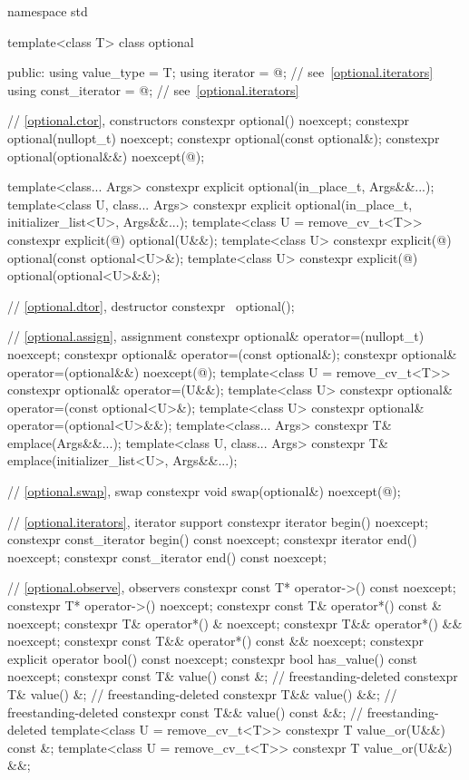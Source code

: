 %
%
\begin{codeblock}
namespace std {
  template<class T>
  class optional {
  public:
    using value_type     = T;
    using iterator       = @\impdefnc@;              // see~\ref{optional.iterators}
    using const_iterator = @\impdefnc@;              // see~\ref{optional.iterators}

    // \ref{optional.ctor}, constructors
    constexpr optional() noexcept;
    constexpr optional(nullopt_t) noexcept;
    constexpr optional(const optional&);
    constexpr optional(optional&&) noexcept(@\seebelow@);

    template<class... Args>
      constexpr explicit optional(in_place_t, Args&&...);
    template<class U, class... Args>
      constexpr explicit optional(in_place_t, initializer_list<U>, Args&&...);
    template<class U = remove_cv_t<T>>
      constexpr explicit(@\seebelow@) optional(U&&);
    template<class U>
      constexpr explicit(@\seebelow@) optional(const optional<U>&);
    template<class U>
      constexpr explicit(@\seebelow@) optional(optional<U>&&);

    // \ref{optional.dtor}, destructor
    constexpr ~optional();

    // \ref{optional.assign}, assignment
    constexpr optional& operator=(nullopt_t) noexcept;
    constexpr optional& operator=(const optional&);
    constexpr optional& operator=(optional&&) noexcept(@\seebelow@);
    template<class U = remove_cv_t<T>> constexpr optional& operator=(U&&);
    template<class U> constexpr optional& operator=(const optional<U>&);
    template<class U> constexpr optional& operator=(optional<U>&&);
    template<class... Args> constexpr T& emplace(Args&&...);
    template<class U, class... Args> constexpr T& emplace(initializer_list<U>, Args&&...);

    // \ref{optional.swap}, swap
    constexpr void swap(optional&) noexcept(@\seebelow@);

    // \ref{optional.iterators}, iterator support
    constexpr iterator begin() noexcept;
    constexpr const_iterator begin() const noexcept;
    constexpr iterator end() noexcept;
    constexpr const_iterator end() const noexcept;

    // \ref{optional.observe}, observers
    constexpr const T* operator->() const noexcept;
    constexpr T* operator->() noexcept;
    constexpr const T& operator*() const & noexcept;
    constexpr T& operator*() & noexcept;
    constexpr T&& operator*() && noexcept;
    constexpr const T&& operator*() const && noexcept;
    constexpr explicit operator bool() const noexcept;
    constexpr bool has_value() const noexcept;
    constexpr const T& value() const &;                                 // freestanding-deleted
    constexpr T& value() &;                                             // freestanding-deleted
    constexpr T&& value() &&;                                           // freestanding-deleted
    constexpr const T&& value() const &&;                               // freestanding-deleted
    template<class U = remove_cv_t<T>> constexpr T value_or(U&&) const &;
    template<class U = remove_cv_t<T>> constexpr T value_or(U&&) &&;

}}
\end{codeblock}
